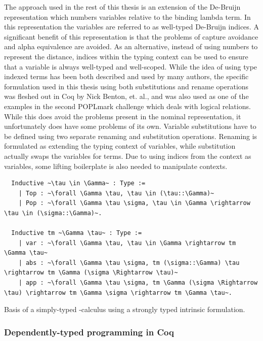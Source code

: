 \documentclass[11pt, final]{article}
\begin{document}
The approach used in the rest of this thesis is an extension of the De-Bruijn representation which numbers variables relative to the binding lambda term.
In this representation the variables are referred to as well-typed De-Bruijn indices.
A significant benefit of this representation is that the problems of capture avoidance and alpha equivalence are avoided.
As an alternative, instead of using numbers to represent the distance, indices within the typing context can be used to ensure that a variable is always well-typed and well-scoped.
While the idea of using type indexed terms has been both described and used by many authors\cite{Altenkirch99}\cite{McBride04}\cite{Adams06}, the specific formulation used in this thesis using both substitutions and rename operations was fleshed out in Coq by Nick Benton, et. al.\cite{Benton2011}, and was also used as one of the examples in the second POPLmark challenge which deals with logical relations\cite{poplmark_reloaded}.
While this does avoid the problems present in the nominal representation, it unfortunately does have some problems of its own.
Variable substitutions have to be defined using two separate renaming and substitution operations.
Renaming is formulated as extending the typing context of variables, while substitution actually swaps the variables for terms.
Due to using indices from the context as variables, some lifting boilerplate is also needed to manipulate contexts.

\begin{listing}[h]
  \begin{verbatim}
  Inductive ~\tau \in \Gamma~ : Type :=
    | Top : ~\forall \Gamma \tau, \tau \in (\tau::\Gamma)~
    | Pop : ~\forall \Gamma \tau \sigma, \tau \in \Gamma \rightarrow \tau \in (\sigma::\Gamma)~.

  Inductive tm ~\Gamma \tau~ : Type :=
    | var : ~\forall \Gamma \tau, \tau \in \Gamma \rightarrow tm \Gamma \tau~
    | abs : ~\forall \Gamma \tau \sigma, tm (\sigma::\Gamma) \tau \rightarrow tm \Gamma (\sigma \Rightarrow \tau)~
    | app : ~\forall \Gamma \tau \sigma, tm \Gamma (\sigma \Rightarrow \tau) \rightarrow tm \Gamma \sigma \rightarrow tm \Gamma \tau~.
  \end{verbatim}
  \caption{Basis of a simply-typed \lambda-calculus using a strongly typed intrinsic formulation.}
  \label{lst:strong_stlc}
\end{listing}

\subsubsection{Dependently-typed programming in Coq}
\end{document}
